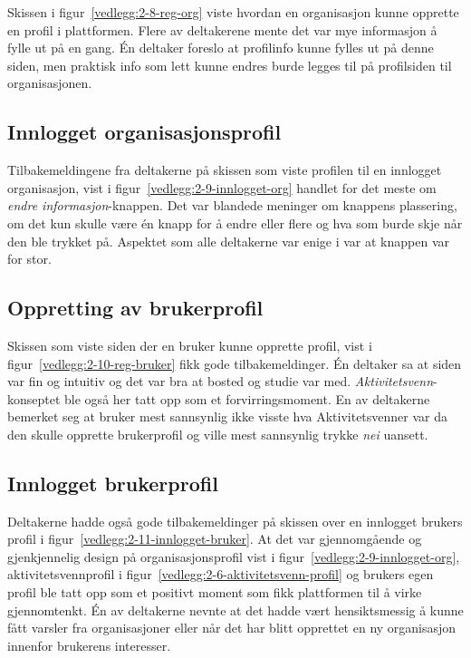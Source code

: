Skissen i figur~\ref{vedlegg:2-8-reg-org} viste hvordan en organisasjon kunne opprette en profil i plattformen. Flere av deltakerene mente det var mye informasjon å fylle ut på en gang. Én deltaker foreslo at profilinfo kunne fylles ut på denne siden, men praktisk info som lett kunne endres burde legges til på profilsiden til organisasjonen.


\subsection{Innlogget organisasjonsprofil}

Tilbakemeldingene fra deltakerne på skissen som viste profilen til en innlogget organisasjon, vist i figur~\ref{vedlegg:2-9-innlogget-org} handlet for det meste om {\em endre informasjon}-knappen. Det var blandede meninger om knappens plassering, om det kun skulle være én knapp for å endre eller flere og hva som burde skje når den ble trykket på. Aspektet som alle deltakerne var enige i var at knappen var for stor.


\subsection{Oppretting av brukerprofil}

Skissen som viste siden der en bruker kunne opprette profil, vist i figur~\ref{vedlegg:2-10-reg-bruker} fikk gode tilbakemeldinger. Én deltaker sa at siden var fin og intuitiv og det var bra at bosted og studie var med. {\em Aktivitetsvenn}-konseptet ble også her tatt opp som et forvirringsmoment. En av deltakerne bemerket seg at bruker mest sannsynlig ikke visste hva Aktivitetsvenner var da den skulle opprette brukerprofil og ville mest sannsynlig trykke {\em nei} uansett.


\subsection{Innlogget brukerprofil}

Deltakerne hadde også gode tilbakemeldinger på skissen over en innlogget brukers profil i figur~\ref{vedlegg:2-11-innlogget-bruker}. At det var gjennomgående og gjenkjennelig design på organisasjonsprofil vist i figur~\ref{vedlegg:2-9-innlogget-org}, aktivitetsvennprofil i figur~\ref{vedlegg:2-6-aktivitetsvenn-profil} og brukers egen profil ble tatt opp som et positivt moment som fikk plattformen til å virke gjennomtenkt. Én av deltakerne nevnte at det hadde vært hensiktsmessig å kunne fått varsler fra organisasjoner eller når det har blitt opprettet en ny organisasjon innenfor brukerens interesser.


